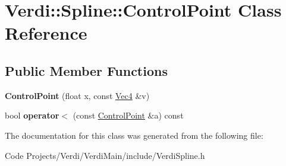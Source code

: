 \hypertarget{class_verdi_1_1_spline_1_1_control_point}{\section{\-Verdi\-:\-:\-Spline\-:\-:\-Control\-Point \-Class \-Reference}
\label{class_verdi_1_1_spline_1_1_control_point}
}
\subsection*{\-Public \-Member \-Functions}
\begin{DoxyCompactItemize}
\item 
\hypertarget{class_verdi_1_1_spline_1_1_control_point_ae2f8e6f72398c24c34e0c5f0bf777bc6}{{\bfseries \-Control\-Point} (float x, const \hyperlink{class_verdi_1_1_vec4}{\-Vec4} \&v)}\label{class_verdi_1_1_spline_1_1_control_point_ae2f8e6f72398c24c34e0c5f0bf777bc6}

\item 
\hypertarget{class_verdi_1_1_spline_1_1_control_point_a51365f5d9694c541606518fdcfed86b1}{bool {\bfseries operator$<$} (const \hyperlink{class_verdi_1_1_spline_1_1_control_point}{\-Control\-Point} \&a) const }\label{class_verdi_1_1_spline_1_1_control_point_a51365f5d9694c541606518fdcfed86b1}

\end{DoxyCompactItemize}


\-The documentation for this class was generated from the following file\-:\begin{DoxyCompactItemize}
\item 
\-Code Projects/\-Verdi/\-Verdi\-Main/include/\-Verdi\-Spline.\-h\end{DoxyCompactItemize}

